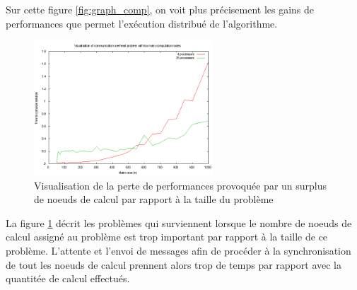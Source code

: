 \documentclass{article}
\begin{document}
Sur cette figure \ref{fig:graph_comp}, on voit plus précisement les gains de performances que permet l'exécution distribué de l'algorithme.

\begin{figure}[h]
\centering
\includegraphics[width=0.6\textwidth]{../perf/results_overhead.png}
\caption{Visualisation de la perte de performances provoquée par un surplus de noeuds de calcul par rapport à la taille du problème}
\label{fig:graph_overhead}
\end{figure}

La figure \ref{fig:graph_overhead} décrit les problèmes qui surviennent lorsque le nombre de noeuds de calcul assigné au problème est trop important par rapport à la taille de ce problème. L'attente et l'envoi de messages afin de procéder à la synchronisation de tout les noeuds de calcul prennent alors trop de temps par rapport avec la quantitée de calcul effectués.
\end{document}
